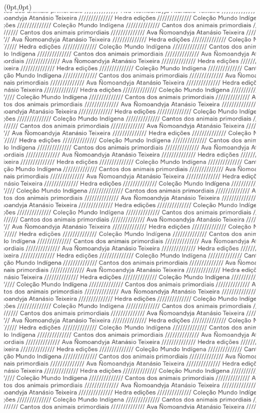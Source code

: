 \thispagestyle{empty}

\begin{textblock*}{2.625in}(0pt,0pt)%
\vspace*{-2.4cm}
\hspace*{-2.65cm}\includegraphics[width=138mm]{./ABERTURA.png}  
\end{textblock*}

\pagebreak
\blankpage

\thispagestyle{empty}



